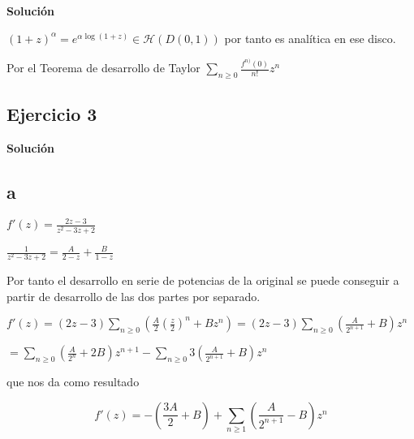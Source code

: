 \textbf{Solución}

$(1+z)^{\alpha} = e^{ \alpha \log(1+z) } \in\mathcal{H}(D(0,1))$ por tanto es analítica en ese disco.

Por el Teorema de desarrollo de Taylor
$\sum_{n\geq 0} \frac{f^{n)}(0)}{n!}z^n$


\subsection{Ejercicio 3}

\textbf{Solución}

\subsection{a} 
$f'(z) = \frac{2z-3}{z^2-3z+2}$

$\frac{1}{z^2-3z+2} = \frac{A}{2-z} + \frac{B}{1-z}$

Por tanto el desarrollo en serie de potencias de la original se puede conseguir a partir de desarrollo de las dos partes por separado.

$f'(z) = (2z-3) \sum_{n\geq 0} (\frac{A}{2} (\frac{z}{2})^n + Bz^n) = (2z-3)\sum_{n\geq 0} (\frac{A}{2^{n+1}} + B)z^n $

$= \sum_{n\geq 0} (\frac{A}{2^{n}} + 2B)z^{n+1} - \sum_{n\geq 0} 3 (\frac{A}{2^{n+1}}+B)z^n$

que nos da como resultado 

$$ f'(z) = -\left(\frac{3A}{2}+B\right) + \sum_{n\geq 1} \left(\frac{A}{2^{n+1}} - B \right)z^n $$
